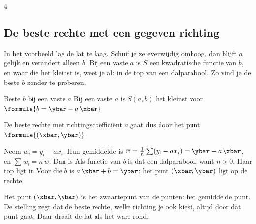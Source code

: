 \begin{alleenvoor}{4}
\subsection{De beste rechte met een gegeven richting}

In het voorbeeld lag de lat te laag. Schuif je ze evenwijdig omhoog, dan blijft $a$ gelijk en verandert alleen $b$. Bij een vaste $a$ is $S$ een kwadratische functie van $b$, en waar die het kleinst is, weet je al: in de top van een dalparabool. Zo vind je de beste $b$ zonder te proberen.


\begin{theorie}
\begin{stelling}{Beste $b$ bij een vaste $a$}
Bij een vaste $a$ is $S(a, b)$ het kleinst voor \quad $\formule{b = \ybar - a\,\xbar}$

\vspace{1mm}
De beste rechte met richtingscoëfficiënt $a$ gaat dus door het punt $\formule{(\xbar, \ybar)}$.
\end{stelling}

\begin{bewijs}
Neem $w_i = y_i - ax_i$. Hun gemiddelde is $\overline{w} = \frac1n \sum (y_i - ax_i) = \ybar - a\,\xbar$, en $\sum w_i = n\,\overline{w}$. Dan is
Als functie van $b$ is dat een dalparabool, want $n > 0$. Haar top ligt in
Voor die $b$ is $a\,\xbar + b = \ybar$: het punt $(\xbar, \ybar)$ ligt op de rechte.
\end{bewijs}
\end{theorie}

Het punt $(\xbar, \ybar)$ is het zwaartepunt van de punten: het gemiddelde punt. De stelling zegt dat de beste rechte, welke richting je ook kiest, altijd door dat punt gaat. Daar draait de lat als het ware rond.



\end{alleenvoor}
